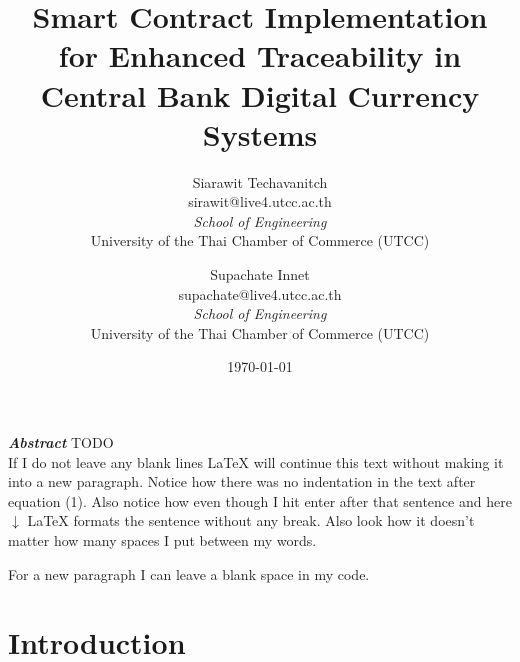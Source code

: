 \documentclass[letterpaper,twocolumn,10pt]{article} %
\title{\textbf{Smart Contract Implementation for Enhanced Traceability in Central Bank Digital Currency Systems}} %
\author{
    Siarawit Techavanitch \\ sirawit@live4.utcc.ac.th \\ \textit{School of Engineering} \\ University of the Thai Chamber of Commerce (UTCC) \and 
    Supachate Innet \\ supachate@live4.utcc.ac.th \\ \textit{School of Engineering} \\ University of the Thai Chamber of Commerce (UTCC) } %
\date{\today} %
\begin{document}
    \maketitle %
    
    
    \textbf{\textit{Abstract}} TODO 
    \begin{equation} %
    \end{equation}
    If I do not leave any blank lines \LaTeX{} will continue  this text without making it into a new paragraph.  Notice how there was no indentation in the text after equation (1).  
    Also notice how even though I hit enter after that sentence and here $\downarrow$
     \LaTeX{} formats the sentence without any break.  Also   look  how      it   doesn't     matter          how    many  spaces     I put     between       my    words.
    
    For a new paragraph I can leave a blank space in my code. 
    \section{Introduction}
\end{document}
